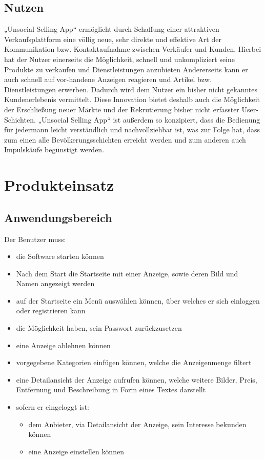 \documentclass[a4paper,12pt,oneside]{scrartcl}
\begin{document}
\subsection{Nutzen}
„Unsocial Selling App“ ermöglicht durch Schaffung einer attraktiven Verkaufsplattform eine völlig neue, sehr direkte und effektive Art der Kommunikation bzw. Kontaktaufnahme zwischen Verkäufer und Kunden.
Hierbei hat der Nutzer einerseits die Möglichkeit, schnell und unkompliziert seine Produkte zu verkaufen und Dienstleistungen anzubieten
Andererseits kann er auch schnell auf vor-handene Anzeigen reagieren und Artikel bzw. Dienstleistungen erwerben.
Dadurch wird dem Nutzer ein bisher nicht gekanntes Kundenerlebenis vermittelt.
Diese Innovation bietet deshalb auch die Möglichkeit der Erschließung neuer Märkte und der Rekrutierung bisher nicht erfasster User-Schichten.
„Unsocial Selling App“ ist außerdem so konzipiert, dass die Bedienung für jedermann leicht verständlich und nachvollziehbar ist, was zur Folge hat, dass zum einen alle Bevölkerungsschichten erreicht werden und zum anderen auch Impulskäufe begünstigt werden. 





\section{Produkteinsatz}
\subsection{Anwendungsbereich}
Der Benutzer muss:
\begin{itemize}
	\item die Software starten können 
	\item Nach dem Start die Startseite mit einer Anzeige, sowie deren Bild und Namen angezeigt werden 
	\item auf der Startseite ein Menü auswählen können, über welches er sich einloggen oder registrieren kann 
	\item die Möglichkeit haben, sein Passwort zurückzusetzen 
	\item eine Anzeige ablehnen können 
	\item vorgegebene Kategorien einfügen können, welche die Anzeigenmenge filtert 
	\item eine Detailansicht der Anzeige aufrufen können, welche weitere Bilder, Preis, Entfernung und Beschreibung in Form eines Textes darstellt 

	\item sofern er eingeloggt ist: 
	\begin{itemize}
		\item dem Anbieter, via Detailansicht der Anzeige, sein Interesse bekunden können
		\item eine Anzeige einstellen können	
	\end{itemize}
\end{itemize}
\end{document}
